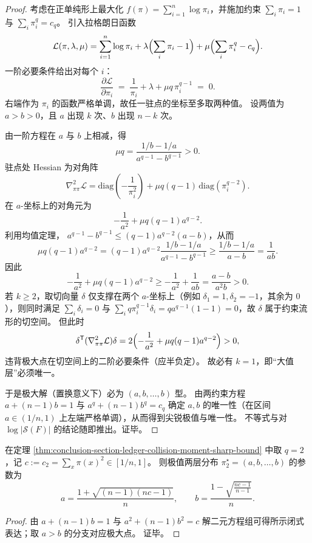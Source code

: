 \begin{proof}
考虑在正单纯形上最大化 \(f(\pi)=\sum_{i=1}^{n}\log\pi_i\)，并施加约束
\(
\sum_i\pi_i=1
\)
与
\(
\sum_i\pi_i^q=c_q
\)。
引入拉格朗日函数
\[
\mathcal L(\pi,\lambda,\mu)=\sum_{i=1}^{n}\log\pi_i+\lambda\Bigl(\sum_i\pi_i-1\Bigr)+\mu\Bigl(\sum_i\pi_i^q-c_q\Bigr).
\]
一阶必要条件给出对每个 \(i\)：
\[
\frac{\partial\mathcal L}{\partial \pi_i}
\;=\;
\frac1{\pi_i}+\lambda+\mu q\,\pi_i^{q-1}
\;=\;0.
\]
右端作为 \(\pi_i\) 的函数严格单调，故任一驻点的坐标至多取两种值。
设两值为 \(a>b>0\)，且 \(a\) 出现 \(k\) 次、\(b\) 出现 \(n-k\) 次。
\par
由一阶方程在 \(a\) 与 \(b\) 上相减，得
\[
\mu q=\frac{1/b-1/a}{a^{q-1}-b^{q-1}}>0.
\]
驻点处 Hessian 为对角阵
\[
\nabla^2_{\pi\pi}\mathcal L
=
\mathrm{diag}\!\left(-\frac1{\pi_i^2}\right)+\mu q(q-1)\,\mathrm{diag}\!\left(\pi_i^{q-2}\right).
\]
在 \(a\)-坐标上的对角元为
\[
-\frac1{a^2}+\mu q(q-1)a^{q-2}.
\]
利用均值定理，
\(
a^{q-1}-b^{q-1}\le (q-1)a^{q-2}(a-b)
\)，从而
\[
\mu q(q-1)a^{q-2}
=
(q-1)a^{q-2}\frac{1/b-1/a}{a^{q-1}-b^{q-1}}
\ge
\frac{1/b-1/a}{a-b}
=\frac{1}{ab}.
\]
因此
\[
-\frac1{a^2}+\mu q(q-1)a^{q-2}
\ge
-\frac1{a^2}+\frac1{ab}
=\frac{a-b}{a^2b}
>0.
\]
若 \(k\ge 2\)，取切向量 \(\delta\) 仅支撑在两个 \(a\)-坐标上（例如 \(\delta_1=1,\delta_2=-1\)，其余为 \(0\)），则同时满足
\(
\sum_i\delta_i=0
\)
与
\(
\sum_i q\pi_i^{q-1}\delta_i=qa^{q-1}(1-1)=0
\)，故 \(\delta\) 属于约束流形的切空间。
但此时
\[
\delta^{\mathsf T}(\nabla^2_{\pi\pi}\mathcal L)\delta
=2\Bigl(-\frac1{a^2}+\mu q(q-1)a^{q-2}\Bigr)
>0,
\]
违背极大点在切空间上的二阶必要条件（应半负定）。
故必有 \(k=1\)，即“大值层”必须唯一。
\par
于是极大解（置换意义下）必为 \((a,b,\dots,b)\) 型。
由两约束方程
\(
a+(n-1)b=1
\) 与 \(
a^q+(n-1)b^q=c_q
\)
确定 \(a,b\) 的唯一性（在区间 \(a\in(1/n,1)\) 上左端严格单调），从而得到尖锐极值与唯一性。
不等式与对 \(\log|\mathcal S(F)|\) 的结论随即推出。证毕。
\end{proof}

\begin{corollary}[\(q=2\) 的显式两层解]\label{cor:conclusion-section-ledger-collision-moment-q2-explicit}
在定理 \ref{thm:conclusion-section-ledger-collision-moment-sharp-bound} 中取 \(q=2\)，记 \(c:=c_2=\sum_x\pi(x)^2\in[1/n,1]\)。
则极值两层分布 \(\pi^\star_2=(a,b,\dots,b)\) 的参数为
\[
a=\frac{1+\sqrt{(n-1)(nc-1)}}{n},
\qquad
b=\frac{1-\sqrt{\frac{nc-1}{n-1}}}{n}.
\]
\end{corollary}

\begin{proof}
由 \(a+(n-1)b=1\) 与 \(a^2+(n-1)b^2=c\) 解二元方程组可得所示闭式表达；取 \(a>b\) 的分支对应极大点。
证毕。
\end{proof}

\endinput
